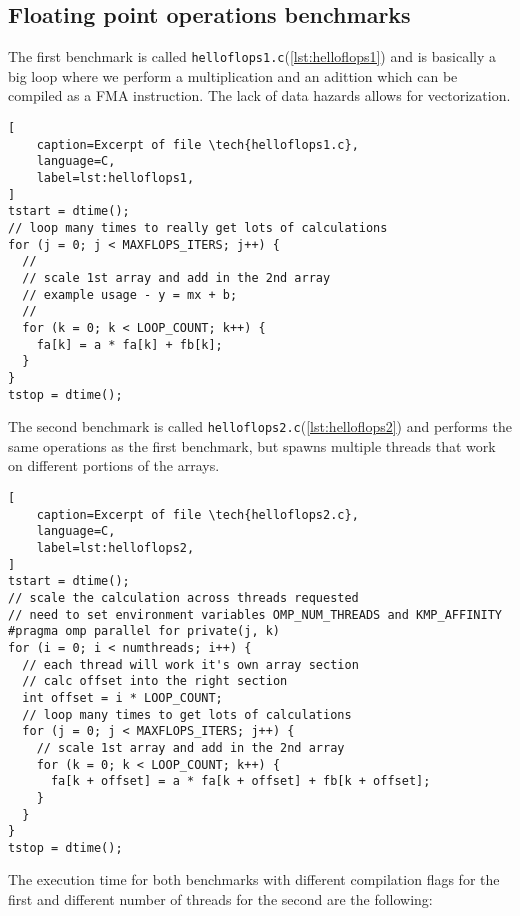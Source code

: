 \documentclass[
    12pt, %
]{fphw}
\newcommand{\tech}{\texttt}
\begin{document}
\subsection{Floating point operations benchmarks}

    The first benchmark is called \tech{helloflops1.c}(\cref{lst:helloflops1})
and is basically a big loop where we perform a multiplication and an adittion
which can be compiled as a FMA instruction.
The lack of data hazards allows for vectorization.

\begin{lstlisting}[
    caption=Excerpt of file \tech{helloflops1.c},
    language=C,
    label=lst:helloflops1,
]
tstart = dtime();
// loop many times to really get lots of calculations
for (j = 0; j < MAXFLOPS_ITERS; j++) {
  //
  // scale 1st array and add in the 2nd array
  // example usage - y = mx + b;
  //
  for (k = 0; k < LOOP_COUNT; k++) {
    fa[k] = a * fa[k] + fb[k];
  }
}
tstop = dtime();
\end{lstlisting}

    The second benchmark is called \tech{helloflops2.c}(\cref{lst:helloflops2})
and performs the same operations as the first benchmark,
but spawns multiple threads that work on different portions of the arrays.

\begin{lstlisting}[
    caption=Excerpt of file \tech{helloflops2.c},
    language=C,
    label=lst:helloflops2,
]
tstart = dtime();
// scale the calculation across threads requested
// need to set environment variables OMP_NUM_THREADS and KMP_AFFINITY
#pragma omp parallel for private(j, k)
for (i = 0; i < numthreads; i++) {
  // each thread will work it's own array section
  // calc offset into the right section
  int offset = i * LOOP_COUNT;
  // loop many times to get lots of calculations
  for (j = 0; j < MAXFLOPS_ITERS; j++) {
    // scale 1st array and add in the 2nd array
    for (k = 0; k < LOOP_COUNT; k++) {
      fa[k + offset] = a * fa[k + offset] + fb[k + offset];
    }
  }
}
tstop = dtime();
\end{lstlisting}

    The execution time for both benchmarks with different compilation flags for the first
and different number of threads for the second are the following:
\end{document}
